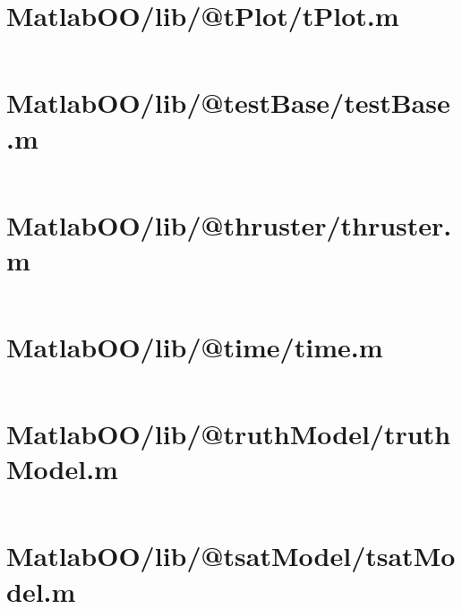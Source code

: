 \pagebreak
\section{MatlabOO/lib/@tPlot/tPlot.m}\label{code:MatlabOO/lib/@tPlot/tPlot.m}
\inputminted[linenos,fontsize=\scriptsize]{matlab}{/home/dcouture/git/mathyourlife/TSatPy/beta_versions/matlab_object_oriented/lib/@tPlot/tPlot.m}

\pagebreak
\section{MatlabOO/lib/@testBase/testBase.m}\label{code:MatlabOO/lib/@testBase/testBase.m}
\inputminted[linenos,fontsize=\scriptsize]{matlab}{/home/dcouture/git/mathyourlife/TSatPy/beta_versions/matlab_object_oriented/lib/@testBase/testBase.m}

\pagebreak
\section{MatlabOO/lib/@thruster/thruster.m}\label{code:MatlabOO/lib/@thruster/thruster.m}
\inputminted[linenos,fontsize=\scriptsize]{matlab}{/home/dcouture/git/mathyourlife/TSatPy/beta_versions/matlab_object_oriented/lib/@thruster/thruster.m}

\pagebreak
\section{MatlabOO/lib/@time/time.m}\label{code:MatlabOO/lib/@time/time.m}
\inputminted[linenos,fontsize=\scriptsize]{matlab}{/home/dcouture/git/mathyourlife/TSatPy/beta_versions/matlab_object_oriented/lib/@time/time.m}

\pagebreak
\section{MatlabOO/lib/@truthModel/truthModel.m}\label{code:MatlabOO/lib/@truthModel/truthModel.m}
\inputminted[linenos,fontsize=\scriptsize]{matlab}{/home/dcouture/git/mathyourlife/TSatPy/beta_versions/matlab_object_oriented/lib/@truthModel/truthModel.m}

\pagebreak
\section{MatlabOO/lib/@tsatModel/tsatModel.m}\label{code:MatlabOO/lib/@tsatModel/tsatModel.m}
\inputminted[linenos,fontsize=\scriptsize]{matlab}{/home/dcouture/git/mathyourlife/TSatPy/beta_versions/matlab_object_oriented/lib/@tsatModel/tsatModel.m}

